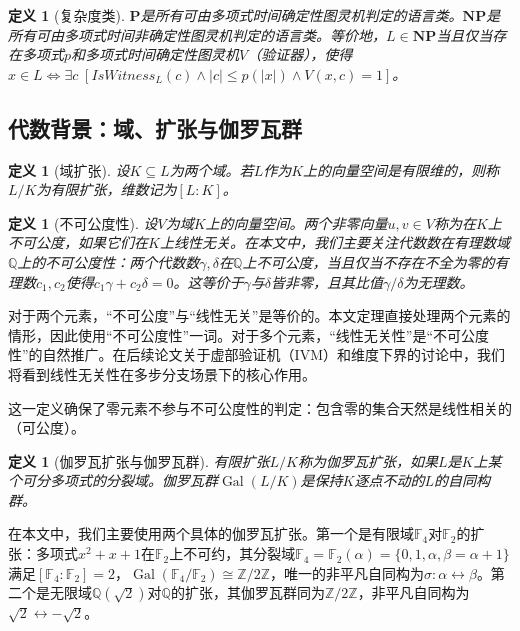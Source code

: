 \documentclass{ctexart}
\newtheorem{definition}[theorem]{定义}
\begin{document}
	\begin{definition}[复杂度类]\label{def:complexity}
		$\mathbf{P}$是所有可由多项式时间确定性图灵机判定的语言类。$\mathbf{NP}$是所有可由多项式时间非确定性图灵机判定的语言类。等价地，$L \in \mathbf{NP}$当且仅当存在多项式$p$和多项式时间确定性图灵机$V$（验证器），使得$x \in L \iff \exists c \; [IsWitness_L(c) \land |c| \le p(|x|) \land V(x,c) = 1]$。
	\end{definition}
	
	\subsection{代数背景：域、扩张与伽罗瓦群}
	
	\begin{definition}[域扩张]
		设$K \subseteq L$为两个域。若$L$作为$K$上的向量空间是有限维的，则称$L/K$为有限扩张，维数记为$[L:K]$。
	\end{definition}
	
	\begin{definition}[不可公度性]\label{def:algebraic-incomm}
		设$V$为域$K$上的向量空间。两个非零向量$u, v \in V$称为在$K$上不可公度，如果它们在$K$上线性无关。在本文中，我们主要关注代数数在有理数域$\mathbb{Q}$上的不可公度性：两个代数数$\gamma, \delta$在$\mathbb{Q}$上不可公度，当且仅当不存在不全为零的有理数$c_1, c_2$使得$c_1\gamma + c_2\delta = 0$。这等价于$\gamma$与$\delta$皆非零，且其比值$\gamma/\delta$为无理数。
	\end{definition}
	
	对于两个元素，``不可公度''与``线性无关''是等价的。本文定理直接处理两个元素的情形，因此使用``不可公度性''一词。对于多个元素，``线性无关性''是``不可公度性''的自然推广。在后续论文关于虚部验证机（IVM）和维度下界的讨论中，我们将看到线性无关性在多步分支场景下的核心作用。
	
	这一定义确保了零元素不参与不可公度性的判定：包含零的集合天然是线性相关的（可公度）。
	
	\begin{definition}[伽罗瓦扩张与伽罗瓦群]\label{def:galois}
		有限扩张$L/K$称为伽罗瓦扩张，如果$L$是$K$上某个可分多项式的分裂域。伽罗瓦群$\operatorname{Gal}(L/K)$是保持$K$逐点不动的$L$的自同构群。
	\end{definition}
	
	在本文中，我们主要使用两个具体的伽罗瓦扩张。第一个是有限域$\mathbb{F}_4$对$\mathbb{F}_2$的扩张：多项式$x^2 + x + 1$在$\mathbb{F}_2$上不可约，其分裂域$\mathbb{F}_4 = \mathbb{F}_2(\alpha) = \{0, 1, \alpha, \beta = \alpha+1\}$满足$[\mathbb{F}_4:\mathbb{F}_2] = 2$，$\operatorname{Gal}(\mathbb{F}_4/\mathbb{F}_2) \cong \mathbb{Z}/2\mathbb{Z}$，唯一的非平凡自同构为$\sigma: \alpha \leftrightarrow \beta$。第二个是无限域$\mathbb{Q}(\sqrt{2})$对$\mathbb{Q}$的扩张，其伽罗瓦群同为$\mathbb{Z}/2\mathbb{Z}$，非平凡自同构为$\sqrt{2} \leftrightarrow -\sqrt{2}$。
	
\end{document}

